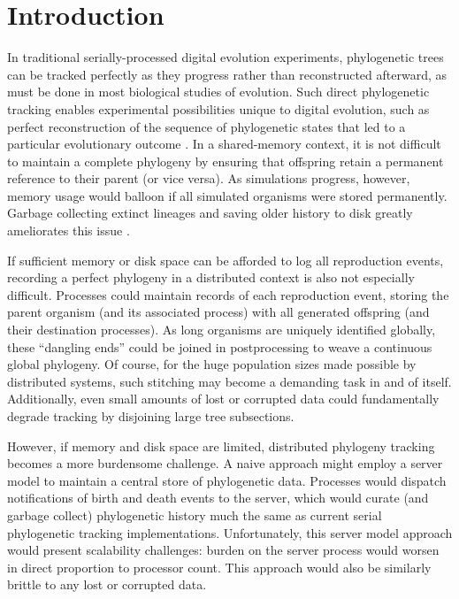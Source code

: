 \section{Introduction} \label{sec:introduction}

In traditional serially-processed digital evolution experiments, phylogenetic trees can be tracked perfectly as they progress \citep{bohm2017mabe,wang2018vine,lalejini2019data} rather than reconstructed afterward, as must be done in most biological studies of evolution.
Such direct phylogenetic tracking enables experimental possibilities unique to digital evolution, such as perfect reconstruction of the sequence of phylogenetic states that led to a particular evolutionary outcome \citep{lenski2003evolutionary, dolson2020interpreting}.
In a shared-memory context, it is not difficult to maintain a complete phylogeny by ensuring that offspring retain a permanent reference to their parent (or vice versa).
As simulations progress, however, memory usage would balloon if all simulated organisms were stored permanently.
Garbage collecting extinct lineages and saving older history to disk greatly ameliorates this issue \citep{bohm2017mabe,dolson2019modes}.

If sufficient memory or disk space can be afforded to log all reproduction events, recording a perfect phylogeny in a distributed context is also not especially difficult.
Processes could maintain records of each reproduction event, storing the parent organism (and its associated process) with all generated offspring (and their destination processes).
As long organisms are uniquely identified globally, these ``dangling ends'' could be joined in postprocessing to weave a continuous global phylogeny.
Of course, for the huge population sizes made possible by distributed systems, such stitching may become a demanding task in and of itself.
Additionally, even small amounts of lost or corrupted data could fundamentally degrade tracking by disjoining large tree subsections.

However, if memory and disk space are limited, distributed phylogeny tracking becomes a more burdensome challenge.
A naive approach might employ a server model to maintain a central store of phylogenetic data.
Processes would dispatch notifications of birth and death events to the server, which would curate (and garbage collect) phylogenetic history much the same as current serial phylogenetic tracking implementations.
Unfortunately, this server model approach would present scalability challenges: burden on the server process would worsen in direct proportion to processor count.
This approach would also be similarly brittle to any lost or corrupted data.

